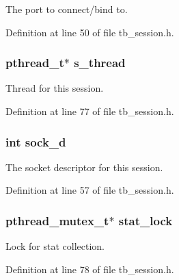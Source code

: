 The port to connect/bind to. 



Definition at line 50 of file tb\-\_\-session.\-h.

\hypertarget{structtb__session__t_ae0b73c023bde38042a32ba345baca741}{
\subsubsection[{s\-\_\-thread}]{\setlength{\rightskip}{0pt plus 5cm}pthread\-\_\-t$\ast$ s\-\_\-thread}}\label{structtb__session__t_ae0b73c023bde38042a32ba345baca741}


Thread for this session. 



Definition at line 77 of file tb\-\_\-session.\-h.

\hypertarget{structtb__session__t_a94d540b145f21be2f9b28a2c225ccf30}{
\subsubsection[{sock\-\_\-d}]{\setlength{\rightskip}{0pt plus 5cm}int sock\-\_\-d}}\label{structtb__session__t_a94d540b145f21be2f9b28a2c225ccf30}


The socket descriptor for this session. 



Definition at line 57 of file tb\-\_\-session.\-h.

\hypertarget{structtb__session__t_ab828bf6b1b85621025b518a892b79d79}{
\subsubsection[{stat\-\_\-lock}]{\setlength{\rightskip}{0pt plus 5cm}pthread\-\_\-mutex\-\_\-t$\ast$ stat\-\_\-lock}}\label{structtb__session__t_ab828bf6b1b85621025b518a892b79d79}


Lock for stat collection. 



Definition at line 78 of file tb\-\_\-session.\-h.

